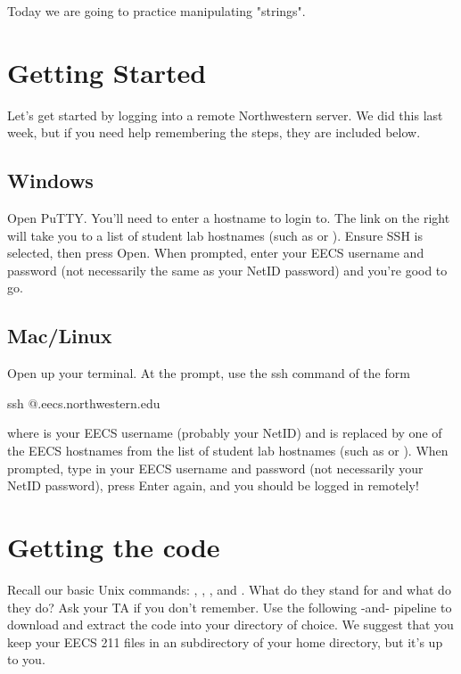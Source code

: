 \documentclass{tufte-handout}
\begin{document}
\maketitle

Today we are going to practice manipulating "strings".

\section{Getting Started}
Let's get started by logging into a remote Northwestern server. We did this last week, but if you need help remembering the steps, they are included below.

\subsection{Windows}
Open PuTTY. You'll need to enter a hostname to login to. The link on the
right will take you to a list of student lab hostnames (such as  or ).  Ensure SSH is selected, then press Open. When prompted, enter your EECS username and password (not necessarily the same as your NetID password) and you're good to go.

\subsection{Mac/Linux}
Open up your terminal. At the prompt, use the ssh command of the form
\begin{CmdLine*}
  \C ssh @.eecs.northwestern.edu \\
\end{CmdLine*}
\noindent where  is your EECS username (probably your NetID)
and  is replaced by one of the EECS hostnames from the list
of student lab hostnames (such as  or
).
When prompted, type in your EECS username and password (not necessarily your NetID password), press
Enter again, and you should be logged in remotely!

\section{Getting the code} Recall our basic Unix commands:
, , , and . What
do they stand for and what do they do? Ask your TA if you don't
remember. Use the following
-and- pipeline to download and extract the
code into your directory of choice. We suggest that you keep your EECS
211 files in an  subdirectory of your home directory,
but it's up to you.
\end{document}
